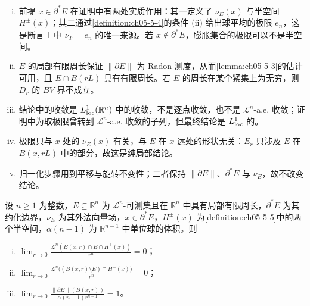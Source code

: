 \documentclass[../../main.tex]{subfiles}%
\begin{document}
\begin{remark}\label{remark:ch05-thm-5-13-条件}
\begin{enumerate}[(i)]
\item 前提 $x\in\partial^*E$ 在证明中有两处实质作用：其一定义了 $\nu_E(x)$ 与半空间 $H^{\pm}(x)$；其二通过\cref{definition:ch05-5-4}的条件 (ii) 给出球平均的极限 $e_n$，这是断言 1 中 $\nu_F=e_n$ 的唯一来源。若 $x\notin\partial^*E$，膨胀集合的极限可以不是半空间。%
\item $E$ 的局部有限周长保证 $\lVert\partial E\rVert$ 为 Radon 测度，从而\cref{lemma:ch05-5-3}的估计可用，且 $E\cap B(rL)$ 具有有限周长。若 $E$ 的周长在某个紧集上为无穷，则 $D_r$ 的 $BV$ 界不成立。%
\item 结论中的收敛是 $L^1_{\mathrm{loc}}(\mathbb{R}^n)$ 中的收敛，不是逐点收敛，也不是 $\mathcal{L}^n$-a.e. 收敛；证明中为取极限曾转到 $\mathcal{L}^n$-a.e. 收敛的子列，但最终结论是 $L^1_{\mathrm{loc}}$ 的。
\item 极限只与 $x$ 处的 $\nu_E(x)$ 有关，与 $E$ 在 $x$ 远处的形状无关：$E_r$ 只涉及 $E$ 在 $B(x,rL)$ 中的部分，故这是纯局部结论。
\item 归一化步骤用到平移与旋转不变性；二者保持 $\lVert\partial E\rVert$、$\partial^*E$ 与 $\nu_E$，故不改变结论。
\end{enumerate}
\end{remark}

\begin{theorem}[约化边界膨胀的进一步性质]\label{theorem:ch05-5-14}
设 $n\geqslant1$ 为整数，$E\subseteq\mathbb{R}^n$ 为 $\mathcal{L}^n$-可测集且在 $\mathbb{R}^n$ 中具有局部有限周长，$\partial^*E$ 为其约化边界，$\nu_E$ 为其外法向量场，$x\in\partial^*E$，$H^{\pm}(x)$ 为\cref{definition:ch05-5-5}中的两个半空间，$\alpha(n-1)$ 为 $\mathbb{R}^{n-1}$ 中单位球的体积。则%
\begin{enumerate}[(i)]
\item $\displaystyle\lim_{r\to0}\frac{\mathcal{L}^n(B(x,r)\cap E\cap H^+(x))}{r^n}=0$；
\item $\displaystyle\lim_{r\to0}\frac{\mathcal{L}^n\bigl((B(x,r)\setminus E)\cap H^-(x)\bigr)}{r^n}=0$；
\item $\displaystyle\lim_{r\to0}\frac{\lVert\partial E\rVert(B(x,r))}{\alpha(n-1)r^{n-1}}=1$。
\end{enumerate}
\end{theorem}
\end{document}
